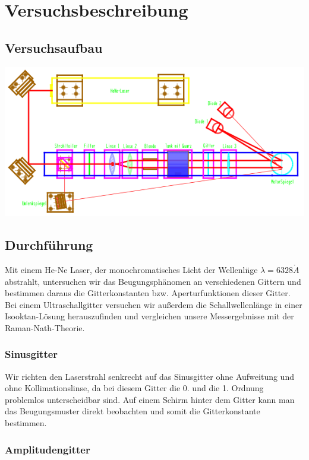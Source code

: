 \section{Versuchsbeschreibung}

\subsection{Versuchsaufbau}
\begin{center}
	\includegraphics[width = \textwidth]{Bilder/Aufbau.jpg}
\end{center}


\subsection{Durchf\"uhrung}

Mit einem He-Ne Laser, der monochromatisches Licht der Wellenl\"nge $\lambda = 6328 \mathring{A}$ abstrahlt, untersuchen wir das Beugungsph\"anomen an verschiedenen Gittern und bestimmen daraus die Gitterkonstanten bzw. Aperturfunktionen dieser Gitter. Bei einem Ultraschallgitter versuchen wir au\ss erdem die Schallwellenl\"ange in einer Isooktan-L\"osung herauszufinden und vergleichen unsere Messergebnisse mit der Raman-Nath-Theorie.

\subsubsection{Sinusgitter}

Wir richten den Laserstrahl senkrecht auf das Sinusgitter ohne Aufweitung und ohne Kollimationslinse, da bei diesem Gitter die 0. und die 1. Ordnung problemlos unterscheidbar sind. Auf einem Schirm hinter dem Gitter kann man das Beugungsmuster direkt beobachten und somit die Gitterkonstante bestimmen.

\subsubsection{Amplitudengitter}

